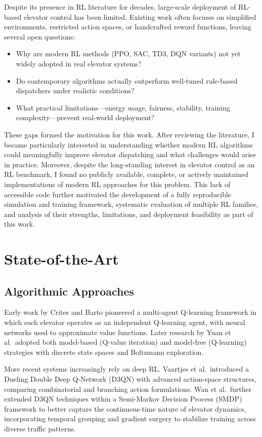 \documentclass[10pt,twocolumn]{article}
\begin{document}
Despite its presence in RL literature for decades, large-scale deployment of RL-based elevator control has been limited. Existing work often focuses on simplified environments, restricted action spaces, or handcrafted reward functions, leaving several open questions:
\begin{itemize}
    \item Why are modern RL methods (PPO, SAC, TD3, DQN variants) not yet widely adopted in real elevator systems?
    \item Do contemporary algorithms actually outperform well-tuned rule-based dispatchers under realistic conditions?
    \item What practical limitations---energy usage, fairness, stability, training complexity---prevent real-world deployment?
\end{itemize}

These gaps formed the motivation for this work. After reviewing the literature, I became particularly interested in understanding whether modern RL algorithms could meaningfully improve elevator dispatching and what challenges would arise in practice. Moreover, despite the long-standing interest in elevator control as an RL benchmark, I found no publicly available, complete, or actively maintained implementations of modern RL approaches for this problem. This lack of accessible code further motivated the development of a fully reproducible simulation and training framework, systematic evaluation of multiple RL families, and analysis of their strengths, limitations, and deployment feasibility as part of this work.

\section{State-of-the-Art}

\subsection{Algorithmic Approaches}

Early work by Crites and Barto  pioneered a multi-agent Q-learning framework in which each elevator operates as an independent Q-learning agent, with neural networks used to approximate value functions\cite{CRITES1995}. Later research by Yuan et al.\ adopted both model-based (Q-value iteration) and model-free (Q-learning) strategies with discrete state spaces and Boltzmann exploration\cite{YUAN2008}.

More recent systems increasingly rely on deep RL. Vaartjes et al.\ introduced a Dueling Double Deep Q-Network (D3QN) with advanced action-space structures, comparing combinatorial and branching action formulations\cite{VAARTJES2025}. Wan et al.\ further extended D3QN techniques within a Semi-Markov Decision Process (SMDP) framework to better capture the continuous-time nature of elevator dynamics, incorporating temporal grouping and gradient surgery to stabilize training across diverse traffic patterns\cite{WAN2024}.
\end{document}
